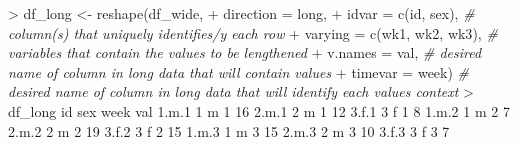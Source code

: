 \documentclass[
]{book}
\newenvironment{Shaded}{\begin{snugshade}}{\end{snugshade}}
\newcommand{\AttributeTok}[1]{\textcolor[rgb]{0.77,0.63,0.00}{#1}}
\newcommand{\CommentTok}[1]{\textcolor[rgb]{0.56,0.35,0.01}{\textit{#1}}}
\newcommand{\DecValTok}[1]{\textcolor[rgb]{0.00,0.00,0.81}{#1}}
\newcommand{\FloatTok}[1]{\textcolor[rgb]{0.00,0.00,0.81}{#1}}
\newcommand{\FunctionTok}[1]{\textcolor[rgb]{0.00,0.00,0.00}{#1}}
\newcommand{\NormalTok}[1]{#1}
\newcommand{\OtherTok}[1]{\textcolor[rgb]{0.56,0.35,0.01}{#1}}
\newcommand{\SpecialCharTok}[1]{\textcolor[rgb]{0.00,0.00,0.00}{#1}}
\newcommand{\StringTok}[1]{\textcolor[rgb]{0.31,0.60,0.02}{#1}}
\begin{document}
\begin{Shaded}
\begin{Highlighting}[]
\SpecialCharTok{\textgreater{}}\NormalTok{ df\_long }\OtherTok{\textless{}{-}} \FunctionTok{reshape}\NormalTok{(df\_wide,}
\SpecialCharTok{+}                         \AttributeTok{direction =} \StringTok{\textquotesingle{}long\textquotesingle{}}\NormalTok{,}
\SpecialCharTok{+}                         \AttributeTok{idvar =} \FunctionTok{c}\NormalTok{(}\StringTok{\textquotesingle{}id\textquotesingle{}}\NormalTok{, }\StringTok{\textquotesingle{}sex\textquotesingle{}}\NormalTok{), }\CommentTok{\# column(s) that uniquely identifies/y each row}
\SpecialCharTok{+}                         \AttributeTok{varying =} \FunctionTok{c}\NormalTok{(}\StringTok{\textquotesingle{}wk1\textquotesingle{}}\NormalTok{, }\StringTok{\textquotesingle{}wk2\textquotesingle{}}\NormalTok{, }\StringTok{\textquotesingle{}wk3\textquotesingle{}}\NormalTok{), }\CommentTok{\# variables that contain the values to be lengthened}
\SpecialCharTok{+}                         \AttributeTok{v.names =} \StringTok{\textquotesingle{}val\textquotesingle{}}\NormalTok{, }\CommentTok{\# desired name of column in long data that will contain values}
\SpecialCharTok{+}                         \AttributeTok{timevar =} \StringTok{\textquotesingle{}week\textquotesingle{}}\NormalTok{) }\CommentTok{\# desired name of column in long data that will identify each value\textquotesingle{}s context}
\SpecialCharTok{\textgreater{}}\NormalTok{ df\_long}
\NormalTok{      id sex week val}
\FloatTok{1.}\NormalTok{m}\FloatTok{.1}  \DecValTok{1}\NormalTok{   m    }\DecValTok{1}  \DecValTok{16}
\FloatTok{2.}\NormalTok{m}\FloatTok{.1}  \DecValTok{2}\NormalTok{   m    }\DecValTok{1}  \DecValTok{12}
\FloatTok{3.}\NormalTok{f}\FloatTok{.1}  \DecValTok{3}\NormalTok{   f    }\DecValTok{1}   \DecValTok{8}
\FloatTok{1.}\NormalTok{m}\FloatTok{.2}  \DecValTok{1}\NormalTok{   m    }\DecValTok{2}   \DecValTok{7}
\FloatTok{2.}\NormalTok{m}\FloatTok{.2}  \DecValTok{2}\NormalTok{   m    }\DecValTok{2}  \DecValTok{19}
\FloatTok{3.}\NormalTok{f}\FloatTok{.2}  \DecValTok{3}\NormalTok{   f    }\DecValTok{2}  \DecValTok{15}
\FloatTok{1.}\NormalTok{m}\FloatTok{.3}  \DecValTok{1}\NormalTok{   m    }\DecValTok{3}  \DecValTok{15}
\FloatTok{2.}\NormalTok{m}\FloatTok{.3}  \DecValTok{2}\NormalTok{   m    }\DecValTok{3}  \DecValTok{10}
\FloatTok{3.}\NormalTok{f}\FloatTok{.3}  \DecValTok{3}\NormalTok{   f    }\DecValTok{3}   \DecValTok{7}
\end{Highlighting}
\end{Shaded}
\end{document}

